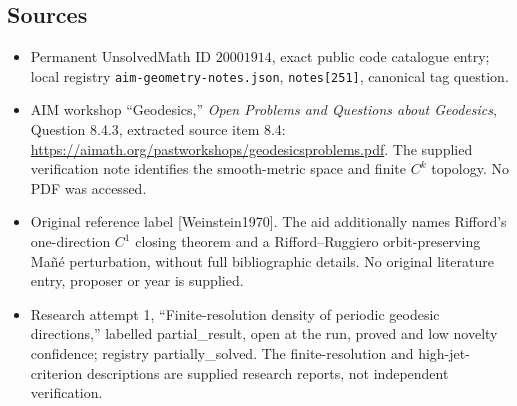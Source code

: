 \documentclass[11pt]{article}
\begin{document}
\subsection{Sources}
\begin{itemize}
\item Permanent UnsolvedMath ID \(20001914\), exact public code catalogue entry; local registry \texttt{aim-geometry-notes.json}, \texttt{notes[251]}, canonical tag question.
\item AIM workshop ``Geodesics,'' \emph{Open Problems and Questions about Geodesics}, Question 8.4.3, extracted source item 8.4: \url{https://aimath.org/pastworkshops/geodesicsproblems.pdf}. The supplied verification note identifies the smooth-metric space and finite \(C^k\) topology. No PDF was accessed.
\item Original reference label [Weinstein1970]. The aid additionally names Rifford's one-direction \(C^1\) closing theorem and a Rifford--Ruggiero orbit-preserving Ma\~n\'e perturbation, without full bibliographic details. No original literature entry, proposer or year is supplied.
\item Research attempt 1, ``Finite-resolution density of periodic geodesic directions,'' labelled partial\_result, open at the run, proved and low novelty confidence; registry partially\_solved. The finite-resolution and high-jet-criterion descriptions are supplied research reports, not independent verification.
\end{itemize}
\end{document}
